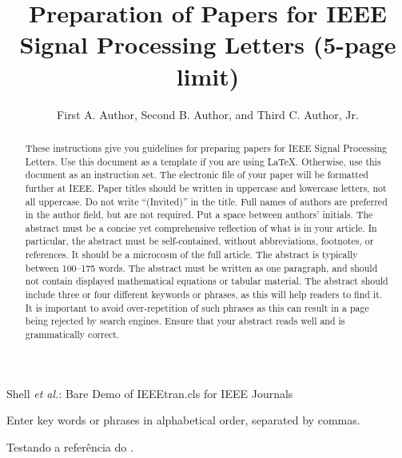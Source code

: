 \documentclass[journal]{IEEEtran}
\begin{document}
\title{Preparation of Papers for IEEE Signal Processing Letters (5-page limit)}

\author{First A. Author, Second B. Author, and Third C. Author, Jr.}

{Shell \MakeLowercase{\textit{et al.}}: Bare Demo of IEEEtran.cls for IEEE Journals}
\maketitle

\begin{abstract}
These instructions give you guidelines for preparing papers for IEEE Signal Processing Letters. Use this document as a template if you are using \LaTeX. Otherwise, use this document as an instruction set. The electronic file of your paper will be formatted further at IEEE. Paper titles should be written in uppercase and lowercase letters, not all uppercase. Do not write ``(Invited)'' in the title. Full names of authors are preferred in the author field, but are not required. Put a space between authors’ initials. The abstract must be a concise yet comprehensive reflection of what is in your article. In particular, the abstract must be self-contained, without abbreviations, footnotes, or references. It should be a microcosm of the full article. The abstract is typically between 100--175 words. The abstract must be written as one paragraph, and should not contain displayed mathematical equations or tabular material. The abstract should include three or four different keywords or phrases, as this will help readers to find it. It is important to avoid over-repetition of such phrases as this can result in a page being rejected by search engines. Ensure that your abstract reads well and is grammatically correct.
\end{abstract}

\begin{IEEEkeywords}
Enter key words or phrases in alphabetical order, separated by commas.
\end{IEEEkeywords}


Testando a referência do \cite{pastro2019}.

\IEEEpeerreviewmaketitle


 

\end{document}
